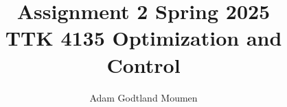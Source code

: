 \documentclass[11pt,a4paper]{article}
\title{Assignment 2 Spring 2025\\ \normalsize TTK 4135 Optimization and Control}
\author{Adam Godtland Moumen}
\begin{document}
\setlength{\parindent}{0cm}
\begin{titlepage}
    \maketitle
\end{titlepage}
\tableofcontents
\clearpage
{}


\end{document}
